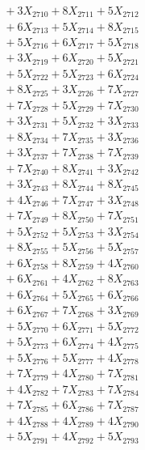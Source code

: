 \documentclass[a4paper,10pt]{article}
\begin{document}
{\begin{align}
&\;  + 3 X_{2710} + 8 X_{2711} + 5 X_{2712} \\[0.3ex]
&\;  + 6 X_{2713} + 5 X_{2714} + 8 X_{2715} \\[0.3ex]
&\;  + 5 X_{2716} + 6 X_{2717} + 5 X_{2718} \\[0.3ex]
&\;  + 3 X_{2719} + 6 X_{2720} + 5 X_{2721} \\[0.3ex]
&\;  + 5 X_{2722} + 5 X_{2723} + 6 X_{2724} \\[0.3ex]
&\;  + 8 X_{2725} + 3 X_{2726} + 7 X_{2727} \\[0.3ex]
&\;  + 7 X_{2728} + 5 X_{2729} + 7 X_{2730} \\[0.3ex]
&\;  + 3 X_{2731} + 5 X_{2732} + 3 X_{2733} \\[0.3ex]
&\;  + 8 X_{2734} + 7 X_{2735} + 3 X_{2736} \\[0.3ex]
&\;  + 3 X_{2737} + 7 X_{2738} + 7 X_{2739} \\[0.5ex]\allowbreak
&\;  + 7 X_{2740} + 8 X_{2741} + 3 X_{2742} \\[0.3ex]
&\;  + 3 X_{2743} + 8 X_{2744} + 8 X_{2745} \\[0.3ex]
&\;  + 4 X_{2746} + 7 X_{2747} + 3 X_{2748} \\[0.3ex]
&\;  + 7 X_{2749} + 8 X_{2750} + 7 X_{2751} \\[0.3ex]
&\;  + 5 X_{2752} + 5 X_{2753} + 3 X_{2754} \\[0.3ex]
&\;  + 8 X_{2755} + 5 X_{2756} + 5 X_{2757} \\[0.3ex]
&\;  + 6 X_{2758} + 8 X_{2759} + 4 X_{2760} \\[0.3ex]
&\;  + 6 X_{2761} + 4 X_{2762} + 8 X_{2763} \\[0.3ex]
&\;  + 6 X_{2764} + 5 X_{2765} + 6 X_{2766} \\[0.3ex]
&\;  + 6 X_{2767} + 7 X_{2768} + 3 X_{2769} \\[0.5ex]\allowbreak
&\;  + 5 X_{2770} + 6 X_{2771} + 5 X_{2772} \\[0.3ex]
&\;  + 5 X_{2773} + 6 X_{2774} + 4 X_{2775} \\[0.3ex]
&\;  + 5 X_{2776} + 5 X_{2777} + 4 X_{2778} \\[0.3ex]
&\;  + 7 X_{2779} + 4 X_{2780} + 7 X_{2781} \\[0.3ex]
&\;  + 4 X_{2782} + 7 X_{2783} + 7 X_{2784} \\[0.3ex]
&\;  + 7 X_{2785} + 6 X_{2786} + 7 X_{2787} \\[0.3ex]
&\;  + 4 X_{2788} + 4 X_{2789} + 4 X_{2790} \\[0.3ex]
&\;  + 5 X_{2791} + 4 X_{2792} + 5 X_{2793} \\[0.3ex]

\end{align}}
\end{document}
